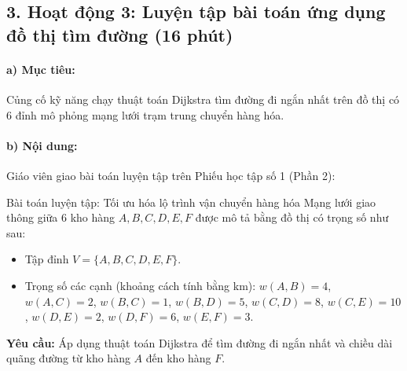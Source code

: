 \documentclass[12pt, a4paper]{article}
\begin{document}
\subsection*{3. Hoạt động 3: Luyện tập bài toán ứng dụng đồ thị tìm đường (16 phút)}

\paragraph{a) Mục tiêu:} Củng cố kỹ năng chạy thuật toán Dijkstra tìm đường đi ngắn nhất trên đồ thị có 6 đỉnh mô phỏng mạng lưới trạm trung chuyển hàng hóa.

\paragraph{b) Nội dung:} Giáo viên giao bài toán luyện tập trên Phiếu học tập số 1 (Phần 2):

\begin{pedabox}{Bài toán luyện tập: Tối ưu hóa lộ trình vận chuyển hàng hóa}
Mạng lưới giao thông giữa 6 kho hàng $A, B, C, D, E, F$ được mô tả bằng đồ thị có trọng số như sau:
\begin{itemize}[leftmargin=0.6cm]
    \item Tập đỉnh $V = \{A, B, C, D, E, F\}$.
    \item Trọng số các cạnh (khoảng cách tính bằng km):
    $w(A, B) = 4$, $w(A, C) = 2$, $w(B, C) = 1$, $w(B, D) = 5$, $w(C, D) = 8$, $w(C, E) = 10$, $w(D, E) = 2$, $w(D, F) = 6$, $w(E, F) = 3$.
\end{itemize}
\textbf{Yêu cầu:} Áp dụng thuật toán Dijkstra để tìm đường đi ngắn nhất và chiều dài quãng đường từ kho hàng $A$ đến kho hàng $F$.
\end{pedabox}
\end{document}
